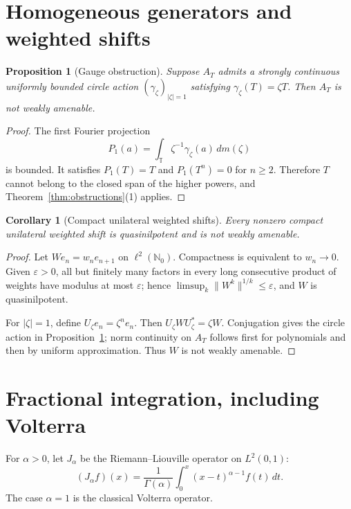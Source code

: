 \documentclass[11pt]{article}
\newtheorem{corollary}[theorem]{Corollary}
\newtheorem{proposition}[theorem]{Proposition}
\newcommand{\AT}{A_T}
\begin{document}
\section{Homogeneous generators and weighted shifts}

\begin{proposition}[Gauge obstruction]
\label{prop:gauge}
Suppose \(\AT\) admits a strongly continuous uniformly bounded circle action
\((\gamma_\zeta)_{|\zeta|=1}\) satisfying
\(\gamma_\zeta(T)=\zeta T\).  Then \(\AT\) is not weakly amenable.
\end{proposition}

\begin{proof}
The first Fourier projection
\[
 P_1(a)=\int_{\mathbb T}\zeta^{-1}\gamma_\zeta(a)\,dm(\zeta)
\]
is bounded.  It satisfies \(P_1(T)=T\) and \(P_1(T^n)=0\) for \(n\ge2\).
Therefore \(T\) cannot belong to the closed span of the higher powers, and
Theorem~\ref{thm:obstructions}(1) applies.
\end{proof}

\begin{corollary}[Compact unilateral weighted shifts]
Every nonzero compact unilateral weighted shift is quasinilpotent and is not
weakly amenable.
\end{corollary}

\begin{proof}
Let \(We_n=w_ne_{n+1}\) on \(\ell^2(\mathbb N_0)\).  Compactness is
equivalent to \(w_n\to0\).  Given \(\varepsilon>0\), all but finitely many
factors in every long consecutive product of weights have modulus at most
\(\varepsilon\); hence \(\limsup_k\|W^k\|^{1/k}\le\varepsilon\), and
\(W\) is quasinilpotent.

For \(|\zeta|=1\), define \(U_\zeta e_n=\zeta^ne_n\).  Then
\(U_\zeta WU_\zeta^*=\zeta W\).  Conjugation gives the circle action in
Proposition~\ref{prop:gauge}; norm continuity on \(\AT\) follows first for
polynomials and then by uniform approximation.  Thus \(W\) is not weakly
amenable.
\end{proof}

\section{Fractional integration, including Volterra}

For \(\alpha>0\), let \(J_\alpha\) be the Riemann--Liouville operator on
\(L^2(0,1)\):
\[
 (J_\alpha f)(x)=\frac1{\Gamma(\alpha)}
 \int_0^x(x-t)^{\alpha-1}f(t)\,dt. \tag{4}
\]
The case \(\alpha=1\) is the classical Volterra operator.
\end{document}
